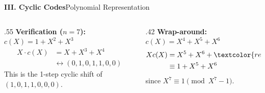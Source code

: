 \begin{frame}{\textbf{III. Cyclic Codes}}{Polynomial Representation}


\medskip
\begin{columns}[T]
  \begin{column}{.55\textwidth}
    \textbf{Verification ($n=7$):}\; $c(X) = 1 + X^2 + X^3$
    \begin{align*}
      X\cdot c(X) &= X + X^3 + X^4 \\
      &\longleftrightarrow (0,1,0,1,1,0,0)
    \end{align*}
    This is the 1-step cyclic shift of $(1,0,1,1,0,0,0)$.\;\checkmark
  \end{column}
  \begin{column}{.42\textwidth}
    \textbf{Wrap-around:}\; $c(X) = X^4+X^5+X^6$
    \begin{align*}
      X c(X) &= X^5+X^6+\textcolor{red}{X^7}\\
      &\equiv 1+X^5+X^6
    \end{align*}
    since $X^7\equiv 1\pmod{X^7-1}$.
  \end{column}
\end{columns}

\medskip
{}
\end{frame}


